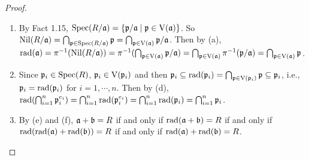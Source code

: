 \begin{proof}
\begin{enumerate}
        \item
            By Fact 1.15, $\operatorname{Spec}(R/\mathfrak{a}) = \{\mathfrak{p}/\mathfrak{a} \mid \mathfrak{p} \in \operatorname{V}(\mathfrak{a})\}$. So $\operatorname{Nil}(R/\mathfrak{a}) = \bigcap_{\mathfrak{p} \in \operatorname{Spec}(R/\mathfrak{a})} \mathfrak{p} = \bigcap_{\mathfrak{p} \in \operatorname{V}(\mathfrak{a})} \mathfrak{p}/\mathfrak{a}$. Then by (a), $\operatorname{rad}(\mathfrak{a}) = \pi^{-1}(\operatorname{Nil}(R/\mathfrak{a}))  = \pi^{-1}(\bigcap_{\mathfrak{p} \in \operatorname{V}(\mathfrak{a})} \mathfrak{p}/\mathfrak{a}) = \bigcap_{\mathfrak{p} \in \operatorname{V}(\mathfrak{a})} \pi^{-1}(\mathfrak{p}/\mathfrak{a}) = \bigcap_{\mathfrak{p} \in \operatorname{V}(\mathfrak{a})} \mathfrak{p}$.
        \item Since $\mathfrak{p}_i \in \operatorname{Spec}(R)$, $\mathfrak{p}_i \in \operatorname{V}(\mathfrak{p}_i)$ and then $\mathfrak{p}_i \subseteq \operatorname{rad}(\mathfrak{p}_i) = \bigcap_{\mathfrak{p} \in \operatorname{V}(\mathfrak{p}_i)}\mathfrak{p} \subseteq \mathfrak{p}_i$, i.e., $\mathfrak{p}_i = \operatorname{rad}(\mathfrak{p}_i)$ for $i = 1,\cdots,n$. Then by (d), $\operatorname{rad}(\bigcap_{i=1}^n \mathfrak{p}_i^{e_i}) = \bigcap_{i=1}^n \operatorname{rad}(\mathfrak{p}_i^{e_i}) = \bigcap_{i=1}^n \operatorname{rad}(\mathfrak{p}_i) = \bigcap_{i=1}^n \mathfrak{p}_i$. 
        \item
            By (e) and (f), $\mathfrak{a} + \mathfrak{b} = R$ if and only if $\operatorname{rad}(\mathfrak{a} + \mathfrak{b}) = R$ if and only if $\operatorname{rad}(\operatorname{rad}(\mathfrak{a}) + \operatorname{rad}(\mathfrak{b})) = R$ if and only if $\operatorname{rad}(\mathfrak{a}) + \operatorname{rad}(\mathfrak{b}) = R$. \qedhere
    \end{enumerate}
\end{proof}

